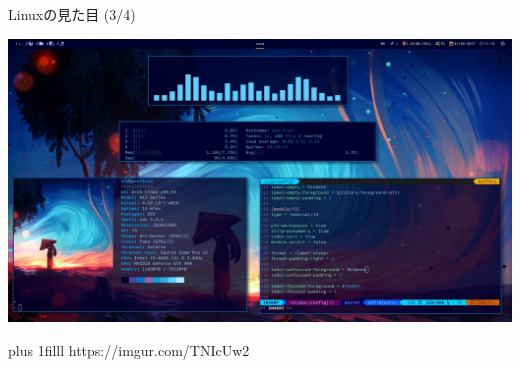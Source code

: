 \documentclass[uplatex, dvipdfmx, 12pt]{beamer}
\newcommand{\source}[1]{{\vskip0pt plus 1filll \scriptsize #1}}
\begin{document}
\begin{frame}{Linuxの見た目 (3/4)}
  \begin{center}\includegraphics[width=\textwidth]{./figures/LinuxRice.jpg}\end{center}
\source{https://imgur.com/TNIcUw2}
\end{frame}
\end{document}
